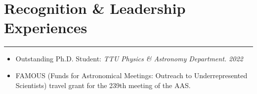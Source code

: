 \documentclass[letterpaper,10pt]{article}
\begin{document}
\section*{Recognition \& Leadership Experiences }       

\hrule
\vspace{.3 cm}

\begin{itemize}[label=$\blacktriangleright$]


\item Outstanding Ph.D. Student: \emph{TTU Physics \& Astronomy Department. 2022} %

\item FAMOUS (Funds for Astronomical Meetings: Outreach to Underrepresented Scientists) travel grant for the 239th meeting of the AAS.



\end{itemize}


\begin{comment}

\hangindent=0.4cm  

$\blacktriangleright$ Bucy Scholarship in Applied Physics: \emph{TTU Physics \& Astronomy Department. Fall 2020} \\  %
  $\blacktriangleright$  Erasmus Mundus Scholarship: 2-year scholarship awarded by the European Commission  \\    
 \hspace{.2 cm}    $\blacktriangleright$  Presidential Scholarship: Full 4-year scholarship awarded by the Dominican Government \\    
\hspace{.2 cm}   $\blacktriangleright$  Member: \emph{Sigma Pi Sigma}, The Physics Honor Society  \\   
\hspace{.2 cm}   $\blacktriangleright$   Lawrence  R. and Abeline Megill Scholarship: \emph{USU Physics Department}   %
\end{comment}
\end{document}
